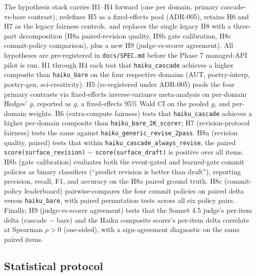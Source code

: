 The hypothesis stack carries H1--H4 forward (one per domain, primary cascade-vs-bare contrast), redefines H5 as a fixed-effects pool (ADR-005), retains H6 and H7 as the legacy fairness controls, and replaces the single legacy H8 with a three-part decomposition (H8a paired-revision quality, H8b gate calibration, H8c commit-policy comparison), plus a new H9 (judge-vs-scorer agreement). All hypotheses are pre-registered in \texttt{docs/SPEC.md} before the Phase 7 managed-API pilot is run. H1 through H4 each test that \texttt{haiku\_cascade} achieves a higher composite than \texttt{haiku\_bare} on the four respective domains (AUT, poetry-interp, poetry-gen, sci-creativity). H5 (re-registered under ADR-005) pools the four primary contrasts via fixed-effects inverse-variance meta-analysis on per-domain Hedges' $g$, reported as $g$, a fixed-effects 95\% Wald CI on the pooled $g$, and per-domain weights. H6 (extra-compute fairness) tests that \texttt{haiku\_cascade} achieves a higher per-domain composite than \texttt{haiku\_bare\_2K\_scorer}; H7 (revision-protocol fairness) tests the same against \texttt{haiku\_generic\_revise\_2pass}. H8a (revision quality, paired) tests that within \texttt{haiku\_cascade\_always\_revise}, the paired \texttt{score(surface\_revision)} $-$ \texttt{score(surface\_draft)} is positive over all items. H8b (gate calibration) evaluates both the event-gated and learned-gate commit policies as binary classifiers (``predict revision is better than draft''), reporting precision, recall, F1, and accuracy on the H8a paired ground truth. H8c (commit-policy leaderboard) pairwise-compares the four commit policies on paired delta versus \texttt{haiku\_bare}, with paired permutation tests across all six policy pairs. Finally, H9 (judge-vs-scorer agreement) tests that the Sonnet 4.5 judge's per-item delta (cascade $-$ bare) and the Haiku composite scorer's per-item delta correlate at Spearman $\rho > 0$ (one-sided), with a sign-agreement diagnostic on the same paired items.

\subsection{Statistical protocol}


